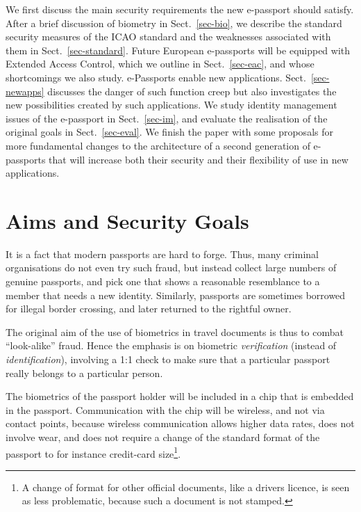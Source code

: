 \documentclass[runningheads,envcountsame,envcountsect,oribibl]{llncs}
\begin{document}
We first discuss the main security
requirements the new e-passport should satisfy. After a brief discussion
of biometry in Sect.~\ref{sec-bio}, we
describe the standard security measures of the ICAO standard 
and the weaknesses associated with them in Sect.~\ref{sec-standard}.
Future European e-passports will be equipped with Extended Access Control, which
we outline in Sect.~\ref{sec-eac}, and whose shortcomings we also study.
e-Passports enable new applications. Sect.~\ref{sec-newapps}
discusses the danger of such function creep but also investigates 
the new possibilities created by such applications.
We study identity management issues of the e-passport in Sect.~\ref{sec-im},
and evaluate the realisation of the original goals in Sect.~\ref{sec-eval}.
We finish the paper with some proposals for more fundamental changes to
the architecture of a second generation of e-passports that will increase 
both their security and their flexibility of use in new applications.



\section{Aims and Security Goals}
\label{sec-aims}

It is a fact that modern passports are hard to forge. Thus, many
criminal organisations do not even try such fraud, but instead collect
large numbers of genuine passports, and pick one that shows a
reasonable resemblance to a member that needs a new
identity. Similarly, passports are sometimes borrowed for illegal
border crossing, and later returned to the rightful owner.

The original aim of the use of biometrics in travel documents is thus
to combat ``look-alike'' fraud. Hence the emphasis is on biometric
\textit{verification} (instead of \textit{identification}), involving
a 1:1 check to make sure that a particular passport really belongs to
a particular person.

The biometrics of the passport holder will be included in a chip that
is embedded in the passport. Communication with the chip will be
wireless, and not via contact points, because wireless communication
allows higher data rates, does not involve wear, and does not require
a change of the standard format of the passport to for instance
credit-card size\footnote{A change of format for other official
documents, like a drivers licence, is seen as less problematic, because such a
document is not stamped.}.
\end{document}
